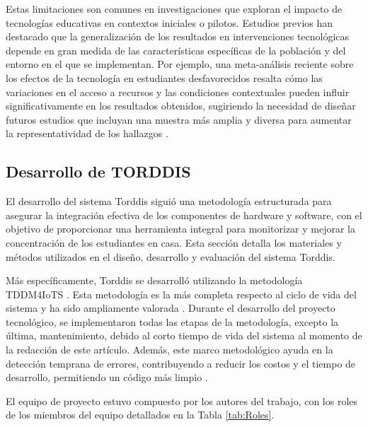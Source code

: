 \documentclass[a4paper,fleqn]{cas-sc}
\begin{document}
			Estas limitaciones son comunes en investigaciones que exploran el impacto de tecnologías educativas en contextos iniciales o pilotos. Estudios previos han destacado que la generalización de los resultados en intervenciones tecnológicas depende en gran medida de las características específicas de la población y del entorno en el que se implementan. Por ejemplo, una meta-análisis reciente sobre los efectos de la tecnología en estudiantes desfavorecidos resalta cómo las variaciones en el acceso a recursos y las condiciones contextuales pueden influir significativamente en los resultados obtenidos, sugiriendo la necesidad de diseñar futuros estudios que incluyan una muestra más amplia y diversa para aumentar la representatividad de los hallazgos \citep{DiPietro2025Meta}.
			
		\subsection{Desarrollo de TORDDIS}
			El desarrollo del sistema Torddis siguió una metodología estructurada para asegurar la integración efectiva de los componentes de hardware y software, con el objetivo de proporcionar una herramienta integral para monitorizar y mejorar la concentración de los estudiantes en casa. Esta sección detalla los materiales y métodos utilizados en el diseño, desarrollo y evaluación del sistema Torddis.
			
			Más específicamente, Torddis se desarrolló utilizando la metodología TDDM4IoTS \citep{Guerrero-Ulloa2020TDDM4IoTS}. Esta metodología es la más completa respecto al ciclo de vida del sistema \citep{Guerrero-Ulloa2023Review} y ha sido ampliamente valorada \citep{Guerrero-Ulloa2023DevIdeAir,Guerrero-Ulloa2023IdeAir,Guerrero-Ulloa2023SP4,Guerrero-Ulloa2023Nawi}. Durante el desarrollo del proyecto tecnológico, se implementaron todas las etapas de la metodología, excepto la última, mantenimiento, debido al corto tiempo de vida del sistema al momento de la redacción de este artículo. Además, este marco metodológico ayuda en la detección temprana de errores, contribuyendo a reducir los costos y el tiempo de desarrollo, permitiendo un código más limpio \citep{Beck2002TDD}.
			
			El equipo de proyecto estuvo compuesto por los autores del trabajo, con los roles de los miembros del equipo detallados en la Tabla \ref{tab:Roles}.
			
\end{document}
